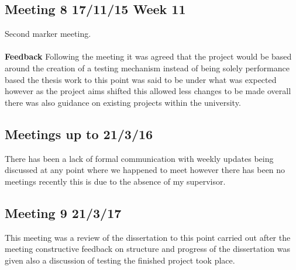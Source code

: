\subsection{Meeting 8 17/11/15 Week 11}
Second marker meeting.\\\\
\textbf{Feedback}
Following the meeting it was agreed that the project would be based around the creation of a testing mechanism instead of being solely performance based the thesis work to this point was said to be under what was expected however as the project aims shifted this allowed less changes to be made overall there was also guidance on existing projects within the university.


\subsection{Meetings up to 21/3/16}
There has been a lack of formal communication with weekly updates being discussed at any point where we happened to meet however there has been no meetings recently this is due to the absence of my supervisor.    

\subsection{Meeting 9 21/3/17}
This meeting was a review of the dissertation to this point carried out  after the meeting constructive feedback on structure and progress of the dissertation was given also a discussion of testing the finished project took place.  
